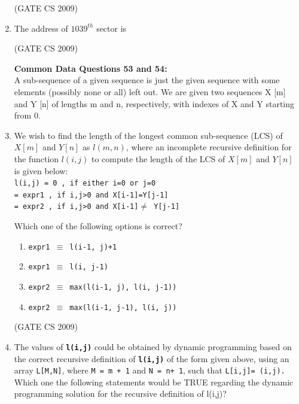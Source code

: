 \documentclass[a4paper, 11pt]{article}
\begin{document}
\begin{enumerate}
    \hfill (GATE CS 2009)

    \item The address of $1039^{th}$ sector is
    \begin{enumerate}
    \end{enumerate}
    
    \hfill (GATE CS 2009)

    \large\textbf{Common Data Questions 53 and 54:}\\
    A sub-sequence of a given sequence is just the given sequence with some elements (possibly none or all) left out. We are given two sequences X [m] and Y [n] of lengths m and n, respectively, with indexes of X and Y starting from 0.
    \item We wish to find the length of the longest common sub-sequence (LCS) of $X[m]$ and $Y[n]$ as $l(m, n)$, where an incomplete recursive definition for the function $l(i, j)$ to compute the length of the LCS of $X[m]$ and $Y[n]$ is given below:\\
    
        \texttt{l(i,j) = 0 , if either i=0 or j=0\\
        = expr1 , if i,j>0 and X[i-1]=Y[j-1]\\
        = expr2 , if i,j>0 and X[i-1]$\neq$ Y[j-1]}

    Which one of the following options is correct?
    \begin{enumerate} 
        \item  \texttt{expr1 $\equiv$ l(i-1, j)+1}
        \item  \texttt{expr1 $\equiv$ l(i, j-1)}
        \item  \texttt{expr2 $\equiv$ max(l(i-1, j), l(i, j-1))}
        \item  \texttt{expr2 $\equiv$ max(l(i-1, j-1), l(i, j))}

    \end{enumerate}

    \hfill (GATE CS 2009)

    \item The values of \texttt{\textbf{l(i,j)}} could be obtained by dynamic programming based on the correct recursive definition of \texttt{\textbf{l(i,j)}} of the form given above, using an array \texttt{L[M,N]}, where \texttt{M = m + 1} and \texttt{N = n+ 1}, such that \texttt{L[i,j]= (i,j).}\\
    Which one the following statements would be TRUE regarding the dynamic programming solution for the recursive definition of l(i,j)?


\end{enumerate}
\end{document}
